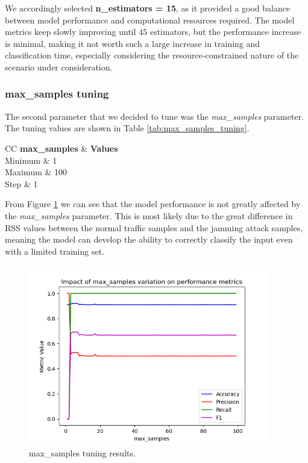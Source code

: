 \documentclass[futureinternet,article,submit,pdftex,moreauthors]{Definitions/mdpi}
\begin{document}
We accordingly selected \textbf{n\_estimators = 15}, as it provided a good balance between model performance and computational resources required.
The model metrics keep slowly improving until $45$ estimators, but the performance increase is minimal, making it not worth such a large increase in training and classification time, especially considering the resource-constrained nature of the scenario under consideration. 

\subsubsection{max\_samples tuning}

The second parameter that we decided to tune was the \textit{max\_samples} parameter. The tuning values are shown in Table \ref{tab:max_samples_tuning}.

\begin{table}[H]
	\caption{max\_samples tuning values.}\label{tab:max_samples_tuning}
	\begin{tabularx}{\textwidth}{CC}
	\toprule
	\textbf{max\_samples} & \textbf{Values} \\
	\midrule
	Minimum & 1 \\
	Maximum & 100 \\
	Step & 1 \\
	\bottomrule
\end{tabularx}
\end{table}

From Figure \ref{fig:max_samples_tuning} we can see that the model performance is not greatly affected by the \textit{max\_samples} parameter. This is most likely due to the great difference in RSS values between the normal traffic samples and the jamming attack samples, meaning the model can develop the ability to correctly classify the input even with a limited training set.

\begin{figure}[H]
	\includegraphics[width=10.5cm]{img/maxSamplesTuning.png}
	\caption{max\_samples tuning results.}\label{fig:max_samples_tuning}
\end{figure}
\unskip
\end{document}

